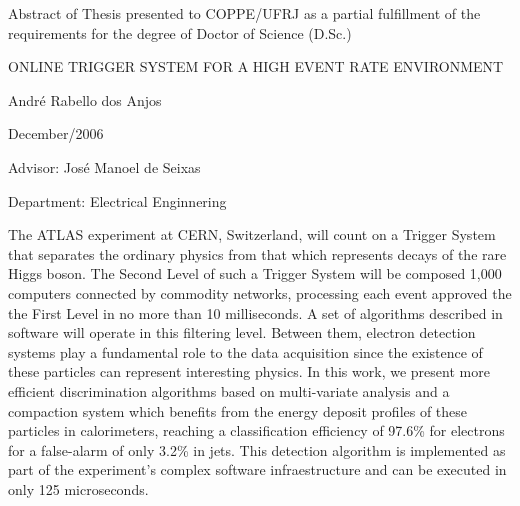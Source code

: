 \clearpage

\noindent
Abstract of Thesis presented to COPPE/UFRJ as a partial fulfillment of the
\linebreak requirements for the degree of Doctor of Science (D.Sc.)

\vspace{1.5cm}

\begin{center}
ONLINE TRIGGER SYSTEM FOR A HIGH EVENT RATE ENVIRONMENT 
\vspace{1cm}

André Rabello dos Anjos
\vspace{1cm}

December/2006
\end{center}
\vspace{2cm}

\noindent
Advisor: José Manoel de Seixas
\vspace{2cm}

\noindent
Department: Electrical Enginnering
\vspace{2cm}

\begin{summary}{1.2}
\hspace{0.8cm}The ATLAS experiment at CERN, Switzerland, will count on a
Trigger System that separates the ordinary physics from that which represents
decays of the rare Higgs boson. The Second Level of such a Trigger System will
be composed 1,000 computers connected by commodity networks, processing each
event approved the the First Level in no more than 10 milliseconds. A set of
algorithms described in software will operate in this filtering level. Between
them, electron detection systems play a fundamental role to the data
acquisition since the existence of these particles can represent interesting
physics. In this work, we present more efficient discrimination algorithms
based on multi-variate analysis and a compaction system which benefits from
the energy deposit profiles of these particles in calorimeters, reaching a
classification efficiency of 97.6\% for electrons for a false-alarm of only
3.2\% in jets. This detection algorithm is implemented as part of the
experiment's complex software infraestructure and can be executed in only 125
microseconds.
\end{summary}
